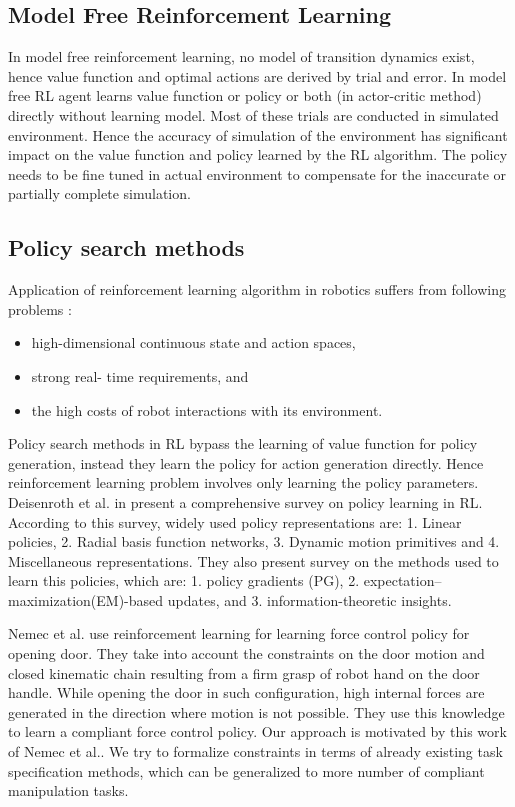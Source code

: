 \documentclass[thesis]{mas_proposal}
\begin{document}
\subsection{Model Free Reinforcement Learning}

In model free reinforcement learning, no model of transition dynamics exist, hence value function and optimal actions are derived by trial and error\cite{polydoros2017survey}. In model free RL agent learns value function or policy or both (in actor-critic method) directly without learning model. Most of these trials are conducted in simulated environment. Hence the accuracy of simulation of the environment has significant impact on the value function and policy learned by the RL algorithm. The policy needs to be fine tuned in actual environment to compensate for the inaccurate or partially complete simulation.

\subsection{Policy search methods}
Application of reinforcement learning algorithm in robotics suffers from following problems \cite{deisenroth2013survey}:
\begin{itemize}
	\item high-dimensional continuous state and action spaces, 
	\item strong real- time requirements, and 
	\item the high costs of robot interactions with its environment.
\end{itemize} 
Policy search methods in RL bypass the learning of value function for policy generation, instead they learn the policy for action generation directly. Hence reinforcement learning problem involves only learning the policy parameters. Deisenroth et al. in \cite{deisenroth2013survey} present a comprehensive survey on policy learning in RL. According to this survey, widely used policy representations are: 1. Linear policies, 2. Radial basis function networks, 3. Dynamic motion primitives and 4. Miscellaneous representations. They also present survey on the methods used to learn this policies, which are: 1. policy gradients (PG), 2. expectation–maximization(EM)-based updates, and 3. information-theoretic insights.

Nemec et al. use reinforcement learning for learning force control policy for opening door\cite{nemec2017door}. They take into account the constraints on the door motion and closed kinematic chain resulting from a firm grasp of robot hand on the door handle. While opening the door in such configuration, high internal forces are generated in the direction where motion is not possible. They use this knowledge to learn a compliant force control policy. Our approach is motivated by this work of Nemec et al.\cite{nemec2017door}. We try to formalize constraints in terms of already existing task specification methods, which can be generalized to more number of compliant manipulation tasks. 
\end{document}
